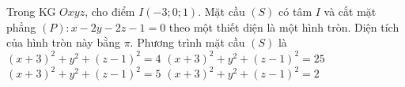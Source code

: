 \begin{ex}%
	Trong KG $Oxyz$, cho điểm $I(-3;0;1)$. Mặt cầu $(S)$ có tâm $I$ và cắt mặt phẳng $(P)\colon x-2y-2z-1=0$ theo một thiết diện là một hình tròn. Diện tích của hình tròn này bằng $\pi$. Phương trình mặt cầu $(S)$ là
	\choice
	{$(x+3)^2+y^2+(z-1)^2=4$}
	{$(x+3)^2+y^2+(z-1)^2=25$}
	{\True $(x+3)^2+y^2+(z-1)^2=5$}
	{$(x+3)^2+y^2+(z-1)^2=2$}
\end{ex}

